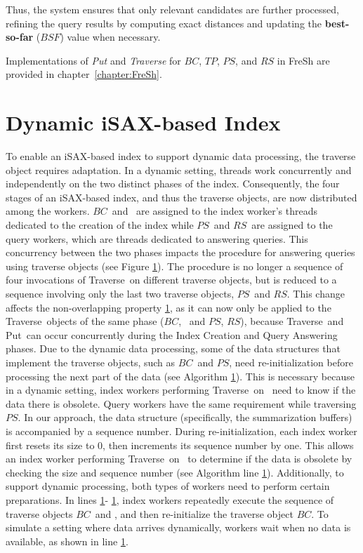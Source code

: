 \documentclass[a4paper,11pt,twoside,openany]{book}
\newcommand{\Put}{\mbox{\sc Put}}
\newcommand{\Traverse}{\mbox{\sc Traverse}}
\newcommand{\BC}{\mbox{$\mathit{BC}$}}
\newcommand{\PS}{\mbox{$\mathit{PS}$}}
\newcommand{\RS}{\mbox{$\mathit{RS}$}}
\begin{document}
Thus, the system ensures that only relevant candidates are further processed,
refining the query results by computing exact distances and updating the
\textbf{best-so-far} ($BSF$) value when necessary.

Implementations of \textit{Put} and \textit{Traverse} for $BC$, $TP$, $PS$, and
$RS$ in FreSh are provided in chapter~\ref{chapter:FreSh}.

\section{Dynamic iSAX-based Index}
To enable an iSAX-based index to support dynamic data processing, the traverse object
requires adaptation. In a dynamic setting, threads work concurrently and independently
on the two distinct phases of the index. Consequently, the four stages of an iSAX-based
index, and thus the traverse objects, are now distributed among the workers. \BC\ and \TP\
are assigned to the index worker's threads dedicated to the creation of the index while 
\PS\ and \RS\ are assigned to the query workers, which are threads dedicated to answering
queries.
% 
This concurrency between the two phases impacts the procedure for answering queries using
traverse objects (see Figure \ref{}). The procedure is no longer a
sequence of four invocations of \Traverse\ on different traverse objects, but is reduced
to a sequence involving only the last two traverse objects, \PS\ and \RS. This change affects
the non-overlapping property \ref{}, as it can now only be applied to the
\Traverse\ objects of the same phase (\BC, \TP\ and \PS, \RS), because \Traverse\ and
\Put\ can occur concurrently during the Index Creation and Query Answering phases.
% 
Due to the dynamic data processing, some of the data structures that implement the traverse
objects, such as \BC\ and \PS, need re-initialization before processing the next part of the
data (see Algorithm \ref{}). This is necessary because in a
dynamic setting, index workers performing \Traverse\ on \TP\ need to know if the data there
is obsolete. Query workers have the same requirement while traversing \PS.
% 
In our approach, the data structure (specifically, the summarization buffers) is accompanied
by a sequence number. During re-initialization, each index worker first resets its size to 0,
then increments its sequence number by one. This allows an index worker performing
\Traverse\ on \TP\ to determine if the data is obsolete by checking the size and sequence number
(see Algorithm line \ref{}).
% 
Additionally, to support dynamic processing, both types of workers need to perform certain
preparations. In lines \ref{}-
\ref{}, index workers repeatedly execute the
sequence of traverse objects \BC\ and \TP, and then re-initialize the traverse object \BC.
To simulate a setting where data arrives dynamically, workers wait when no data is available,
as shown in line \ref{}.
\end{document}

